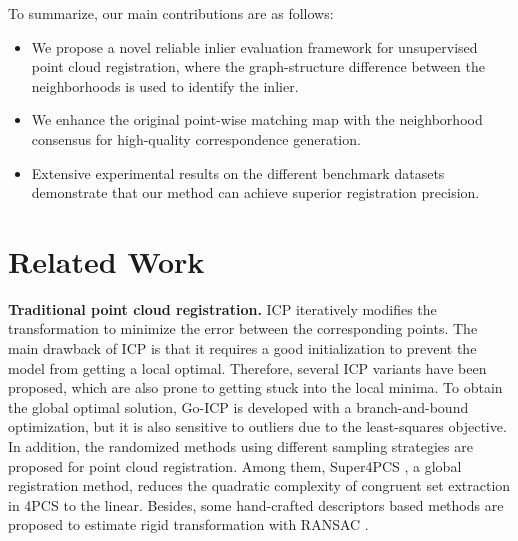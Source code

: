 \documentclass[letterpaper]{article} %
\begin{document}
	To summarize, our main contributions are as follows:
	\begin{itemize}
		\item  We propose a novel reliable inlier evaluation framework for unsupervised point cloud registration, where the graph-structure difference between the neighborhoods is used to identify the inlier.
		\item We enhance the original point-wise matching map with the neighborhood consensus for high-quality correspondence generation.
		\item Extensive experimental results on the different benchmark datasets demonstrate that our method can achieve superior registration precision.
	\end{itemize}

	\section{Related Work}
	\noindent \textbf{Traditional point cloud registration.} ICP \cite{besl1992method} iteratively modifies the transformation to minimize the error between the corresponding points. The main drawback of ICP is that it requires a good initialization to prevent the model from getting a local optimal. Therefore, several ICP variants \cite{phillips2007outlier,bouaziz2013sparse,segal2009generalized} have been proposed, which are also prone to getting stuck into the local minima. To obtain the global optimal solution, Go-ICP \cite{yang2013go} is developed with a branch-and-bound optimization, but it is also sensitive to outliers due to the least-squares objective. %
	In addition, the randomized methods \cite{chen1999ransac,le2019sdrsac} using different sampling strategies are proposed for point cloud registration. %
	Among them, Super4PCS \cite{mellado2014super}, a global registration method, reduces the quadratic complexity of congruent set extraction in 4PCS \cite{aiger20084} to the linear. Besides, some hand-crafted descriptors \cite{rusu2008aligning, rusu2009fast, tombari2010unique} based methods are proposed to estimate rigid transformation with RANSAC \cite{fischler1981random}.
\end{document}
